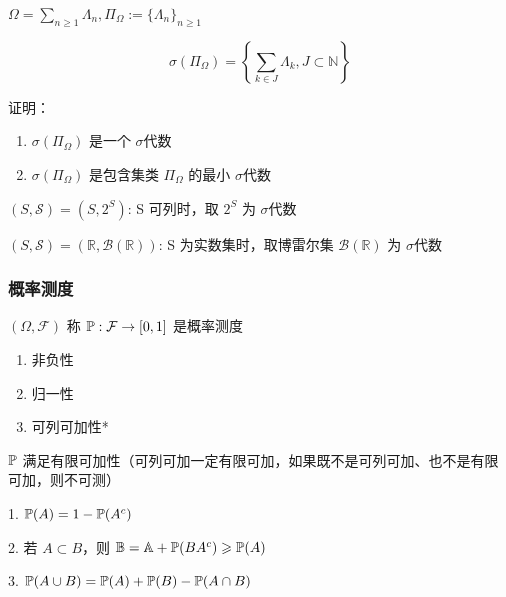 \begin{example}
    $\Omega=\sum_{n\geq 1}\Lambda_n, \Pi_{\Omega}:=\{\Lambda_n\}_{n\geq 1}$

    \[
    \sigma(\Pi_{\Omega})=\left \{\sum_{k\in J}\Lambda_k, J\subset \mathbb{N}\right \}
    \]
\end{example}

\begin{problem}[作业1-1]
    证明：\begin{enumerate}
        \item $\sigma(\Pi_{\Omega})$ 是一个 $\sigma$代数
        \item $\sigma(\Pi_{\Omega})$ 是包含集类 $\Pi_{\Omega}$ 的最小 $\sigma$代数
    \end{enumerate}
\end{problem}


$(S,\mathcal{S})=(S,2^S)$: S 可列时，取 $2^S$ 为 $\sigma$代数

$(S,\mathcal{S})=(\mathbb{R},\mathcal{B}(\mathbb{R}))$: S 为实数集时，取博雷尔集 $\mathcal{B}(\mathbb{R})$ 为 $\sigma$代数


\subsubsection{概率测度}

\begin{definition}[概率测度]\label{def:prob_measure}
    $(\Omega, \mathcal{F})$ 称 $\mathbb{P}: \mathcal{F}\rightarrow [0,1]$ 是概率测度
    \begin{enumerate}
        \item 非负性
        \item 归一性
        \item 可列可加性*
    \end{enumerate}
\end{definition}

\begin{property}
$\mathbb{P}$ 满足有限可加性（可列可加一定有限可加，如果既不是可列可加、也不是有限可加，则不可测）
\end{property}

\begin{corollary}\label{cor:set_operation}
    1. $\mathbb{P}(A)=1-\mathbb{P}(A^c)$

    2. 若 $A\subset B$，则 $\mathbb{B}=\mathbb{A}+\mathbb{P}(BA^c)\geqslant \mathbb{P}(A)$

    3. $\mathbb{P}(A\cup B)=\mathbb{P}(A)+\mathbb{P}(B)-\mathbb{P}(A\cap B)$
\end{corollary}

